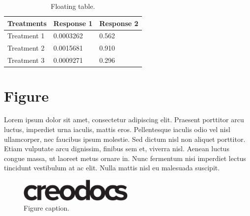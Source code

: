 \documentclass[
	11pt, %
	fleqn, %
	a4paper, %
]{LegrandOrangeBook}
\begin{document}
\begin{table}[t] %
	\centering %
	\begin{tabular}{L{0.15\textwidth} R{0.15\textwidth} R{0.15\textwidth}} %
		\toprule
		\textbf{Treatments} & \textbf{Response 1} & \textbf{Response 2} \\
		\midrule
		Treatment 1         & 0.0003262           & 0.562               \\
		Treatment 2         & 0.0015681           & 0.910               \\
		Treatment 3         & 0.0009271           & 0.296               \\
		\bottomrule
	\end{tabular}
	\caption{Floating table.}
	\label{tab:floating} %
\end{table}


\section{Figure}

Lorem ipsum dolor sit amet, consectetur adipiscing elit. Praesent porttitor arcu luctus, imperdiet urna iaculis, mattis eros. Pellentesque iaculis odio vel nisl ullamcorper, nec faucibus ipsum molestie. Sed dictum nisl non aliquet porttitor. Etiam vulputate arcu dignissim, finibus sem et, viverra nisl. Aenean luctus congue massa, ut laoreet metus ornare in. Nunc fermentum nisi imperdiet lectus tincidunt vestibulum at ac elit. Nulla mattis nisl eu malesuada suscipit.

\begin{figure}[H] %
	\centering %
	\includegraphics[width=0.5\textwidth]{creodocs_logo.pdf} %
	\caption{Figure caption.}
	\label{fig:placeholder} %
\end{figure}
\end{document}
